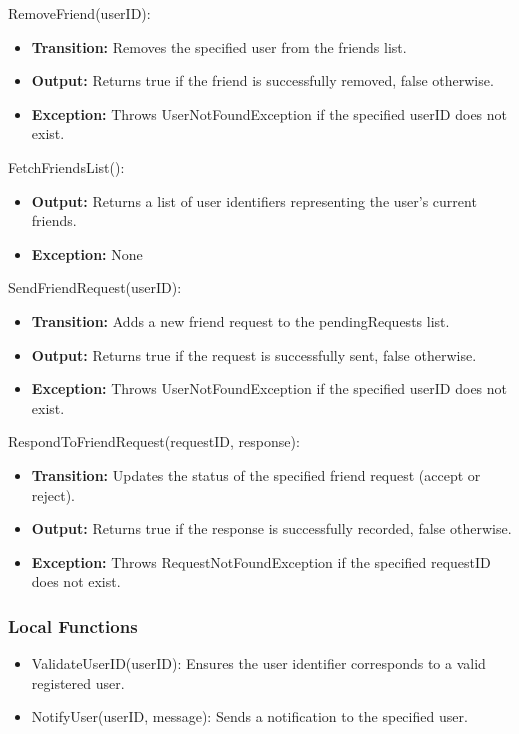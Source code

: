 \documentclass[12pt, titlepage]{article}
\begin{document}
\noindent RemoveFriend(userID):
\begin{itemize}
    \item \textbf{Transition:} Removes the specified user from the friends list.
    \item \textbf{Output:} Returns true if the friend is successfully removed, false otherwise.
    \item \textbf{Exception:} Throws UserNotFoundException if the specified userID does not exist.
\end{itemize}

\noindent FetchFriendsList():
\begin{itemize}
    \item \textbf{Output:} Returns a list of user identifiers representing the user’s current friends.
    \item \textbf{Exception:} None
\end{itemize}

\noindent SendFriendRequest(userID):
\begin{itemize}
    \item \textbf{Transition:} Adds a new friend request to the pendingRequests list.
    \item \textbf{Output:} Returns true if the request is successfully sent, false otherwise.
    \item \textbf{Exception:} Throws UserNotFoundException if the specified userID does not exist.
\end{itemize}

\noindent RespondToFriendRequest(requestID, response):
\begin{itemize}
    \item \textbf{Transition:} Updates the status of the specified friend request (accept or reject).
    \item \textbf{Output:} Returns true if the response is successfully recorded, false otherwise.
    \item \textbf{Exception:} Throws RequestNotFoundException if the specified requestID does not exist.
\end{itemize}

\subsubsection{Local Functions}

\begin{itemize}
    \item ValidateUserID(userID): Ensures the user identifier corresponds to a valid registered user.
    \item NotifyUser(userID, message): Sends a notification to the specified user.
\end{itemize}
\end{document}
